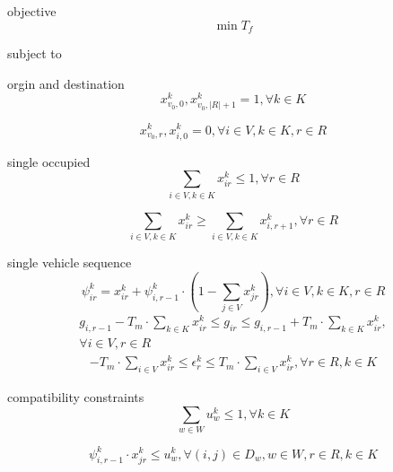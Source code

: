 \documentclass[preprint,12pt,authoryear]{elsarticle}
\begin{document}
objective
\begin{equation}
    \min T_f
\label{msobj}
\end{equation}

subject to

orgin and destination
\begin{equation}
    x_{v_0,0}^k,x_{v_0,|R|+1}^k=1,\forall k\in K 
\label{od}
\end{equation}

\begin{equation}
    x_{v_0,r}^k,x_{i,0}^k=0,\forall i\in V, k\in K,r\in R 
\label{dpt}
\end{equation}

single occupied
\begin{equation}
    \sum_{i\in V,k\in K}{x_{ir}^k}\leq 1, \forall r\in R
\label{so}
\end{equation}

\begin{equation}
    \sum_{i\in V,k\in K}{x_{ir}^k}\geq \sum_{i\in V,k\in K}{x_{i,r+1}^k}, \forall r\in R
\label{zeroafter}
\end{equation}

single vehicle sequence
\begin{equation}
    \psi_{ir}^k=x_{ir}^k+\psi_{i,r-1}^k
    \cdot (1-\sum_{j\in V}{x_{jr}^k}),\forall i\in V,k\in K,r\in R
\label{svs}
\end{equation}
\begin{equation}
    \begin{split}
        g_{i,r-1}-T_m\cdot \sum_{k\in K}{x_{ir}^k} \leq g_{ir}
        \leq g_{i,r-1}+T_m\cdot \sum_{k\in K}{x_{ir}^k},\\
        \forall i\in V ,r\in R
    \end{split}
\label{god}
\end{equation}
\begin{equation}
    \begin{split}
        -T_m\cdot \sum_{i\in V}{x_{ir}^k} \leq \epsilon_r^k \leq T_m\cdot \sum_{i\in V}{x_{ir}^k},
        \forall r\in R,k\in K
    \end{split}
\label{eod}
\end{equation}

compatibility constraints
\begin{equation}
    \sum_{w\in W}{u_w^k}\leq 1, \forall k\in K
\label{scc}
\end{equation}

\begin{equation}
    \psi_{i,r-1}^k \cdot x_{jr}^k\leq u_w^k, \forall (i,j)\in D_w, w\in W, r\in R, k\in K
\label{cc}
\end{equation}
\end{document}
